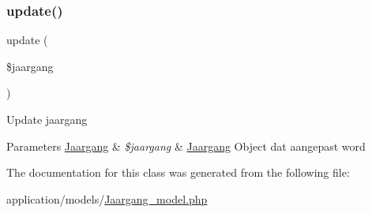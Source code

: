 \subsubsection{\texorpdfstring{update()}{update()}}
{\footnotesize\ttfamily update (\begin{DoxyParamCaption}\item[{}]{\$jaargang }\end{DoxyParamCaption})}

Update jaargang 
\begin{DoxyParams}[1]{Parameters}
\mbox{\hyperlink{class_jaargang}{Jaargang}} & {\em \$jaargang} & \mbox{\hyperlink{class_jaargang}{Jaargang}} Object dat aangepast word \\
\hline
\end{DoxyParams}


The documentation for this class was generated from the following file\+:\begin{DoxyCompactItemize}
\item 
application/models/\mbox{\hyperlink{_jaargang__model_8php}{Jaargang\+\_\+model.\+php}}\end{DoxyCompactItemize}
